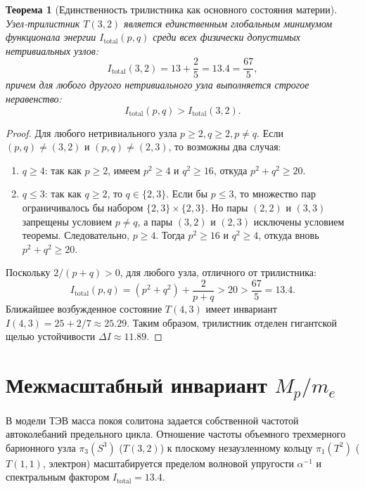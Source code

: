\documentclass[11pt,a4paper]{article}
\newtheorem{theorem}{Теорема}
\theoremstyle{definition}
\theoremstyle{remark}
\begin{document}
\begin{theorem}[Единственность трилистника как основного состояния материи]
\label{thm:trefoil_ground_state}
Узел-трилистник $T(3,2)$ является единственным глобальным минимумом функционала энергии $I_{\mathrm{total}}(p,q)$ среди всех физически допустимых нетривиальных узлов:
\begin{equation}
    I_{\mathrm{total}}(3, 2) = 13 + \frac{2}{5} = \mathbf{13.4} = \frac{67}{5},
\end{equation}
причем для любого другого нетривиального узла выполняется строгое неравенство:
\begin{equation}
    I_{\mathrm{total}}(p, q) > I_{\mathrm{total}}(3, 2).
\end{equation}
\end{theorem}
\begin{proof}
Для любого нетривиального узла $p \ge 2, q \ge 2, p \ne q$. Если $(p,q) \ne (3,2)$ и $(p,q) \ne (2,3)$, то возможны два случая:
\begin{enumerate}
    \item $q \ge 4$: так как $p \ge 2$, имеем $p^2 \ge 4$ и $q^2 \ge 16$, откуда $p^2 + q^2 \ge 20$.
    \item $q \le 3$: так как $q \ge 2$, то $q \in \{2, 3\}$. Если бы $p \le 3$, то множество пар ограничивалось бы набором $\{2, 3\} \times \{2, 3\}$. Но пары $(2,2)$ и $(3,3)$ запрещены условием $p \ne q$, а пары $(3,2)$ и $(2,3)$ исключены условием теоремы. Следовательно, $p \ge 4$. Тогда $p^2 \ge 16$ и $q^2 \ge 4$, откуда вновь $p^2 + q^2 \ge 20$.
\end{enumerate}
Поскольку $2/(p+q) > 0$, для любого узла, отличного от трилистника:
\begin{equation}
    I_{\mathrm{total}}(p, q) = (p^2 + q^2) + \frac{2}{p+q} > 20 > \frac{67}{5} = 13.4.
\end{equation}
Ближайшее возбужденное состояние $T(4,3)$ имеет инвариант $I(4,3) = 25 + 2/7 \approx 25.29$. Таким образом, трилистник отделен гигантской щелью устойчивости $\Delta I \approx 11.89$.
\end{proof}

\section{Межмасштабный инвариант $M_p/m_e$}
В модели ТЭВ масса покоя солитона задается собственной частотой автоколебаний предельного цикла. Отношение частоты объемного трехмерного барионного узла $\pi_3(S^3)$ ($T(3,2)$) к плоскому незаузленному кольцу $\pi_1(T^2)$ ($T(1,1)$, электрон) масштабируется пределом волновой упругости $\alpha^{-1}$ и спектральным фактором $I_{\mathrm{total}} = 13.4$.
\end{document}
